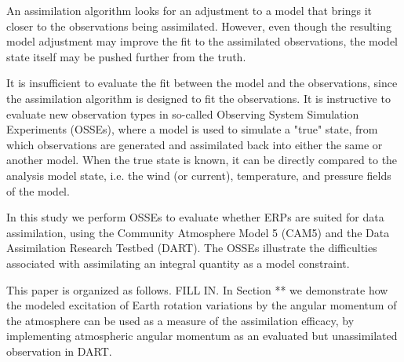 An assimilation algorithm looks for an adjustment to a model that brings it closer to the observations being assimilated. 
However, even though the resulting model adjustment may improve the fit to the assimilated observations, the model state itself may be pushed further from the truth. 


It is insufficient to evaluate the fit between the model and the observations, since the assimilation algorithm is designed to fit the observations. 
It is instructive to evaluate new observation types in so-called Observing System Simulation Experiments (OSSEs), where a model is used to simulate a "true" state, from which observations are generated and assimilated back into either the same or another model. 
When the true state is known, it can be directly compared to the analysis model state, i.e. the wind (or current), temperature, and pressure fields of the model.

In this study we perform OSSEs to evaluate whether ERPs are suited for data assimilation, using the Community Atmosphere Model 5 (CAM5) and the Data Assimilation Research Testbed (DART).  
The OSSEs illustrate the difficulties associated with assimilating an integral quantity as a model constraint.



This paper is organized as follows. 
\textcolor{alert}{FILL IN.}
In Section ** we demonstrate how the modeled excitation of Earth rotation variations by the angular momentum of the atmosphere can be used as a measure of the assimilation efficacy, by implementing atmospheric angular momentum as an evaluated but unassimilated observation in  DART.
